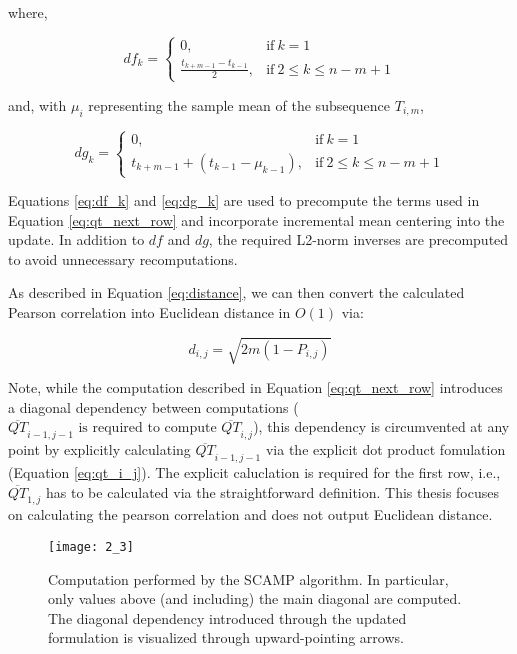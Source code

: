where,

\begin{equation}
    df_k =
    \begin{cases}
        0,                             & \text{if}\ k = 1                 \\
        \frac{t_{k+m-1} - t_{k-1}}{2}, & \text{if}\ 2 \le k \le n - m + 1
    \end{cases}
    \label{eq:df_k}
\end{equation}

and, with $\mu_i$ representing the sample mean of the subsequence $T_{i,m}$,


\begin{equation}
    dg_k =
    \begin{cases}
        0,                                              & \text{if}\ k = 1                 \\
        {t_{k+m-1} + \left(t_{k-1} - \mu_{k-1}\right)}, & \text{if}\ 2 \le k \le n - m + 1
    \end{cases}
    \label{eq:dg_k}
\end{equation}

Equations \ref{eq:df_k} and \ref{eq:dg_k} are used to precompute the terms used in Equation \ref{eq:qt_next_row} and incorporate incremental mean centering into the update. In addition to $df$ and $dg$, the required L2-norm inverses are precomputed to avoid unnecessary recomputations.

As described in Equation \ref{eq:distance}, we can then convert the calculated Pearson correlation into Euclidean distance in $O\left(1\right)$ via:

\begin{equation}
    d_{i,j} = \sqrt{2m\left(1 - P_{i,j}\right)}
    \label{eq:eq_distance}
\end{equation}

Note, while the computation described in Equation \ref{eq:qt_next_row} introduces a diagonal dependency between computations ($\overline{QT}_{i-1,j-1} \text{ is required to compute } \overline{QT}_{i,j}$), this dependency is circumvented at any point by explicitly calculating $\overline{QT}_{i-1,j-1}$ via the explicit dot product fomulation (Equation \ref{eq:qt_i_j}). The explicit caluclation is required for the first row, i.e., $\overline{QT}_{1,j}$ has to be calculated via the straightforward definition. This thesis focuses on calculating the pearson correlation and does not output Euclidean distance.

\begin{figure}[h!]
    \texttt{[image: 2\_3]}
    \centering
    \caption{Computation performed by the SCAMP algorithm. In particular, only values
        above (and including) the main diagonal are computed. The diagonal
        dependency introduced through the updated formulation is visualized
        through upward-pointing arrows.}
    \label{fig:SCAMP_comp}
\end{figure}

